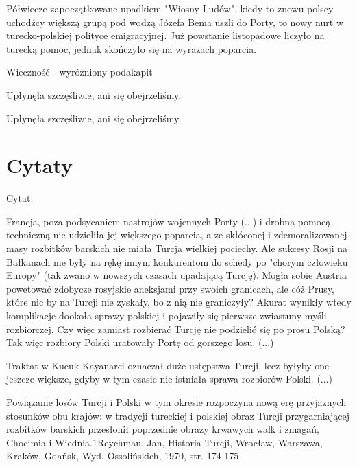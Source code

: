 Półwiecze zapoczątkowane upadkiem "Wiosny Ludów", kiedy to znowu polscy
uchodźcy większą grupą pod wodzą Józefa Bema uszli do Porty, to nowy
nurt w turecko-polskiej polityce emigracyjnej. Już powstanie listopadowe
liczyło na turecką pomoc, jednak skończyło się na wyrazach poparcia.

Wieczność - wyróżniony podakapit

Upłynęła szczęśliwie, ani się obejrzeliśmy.

Upłynęła szczęśliwie, ani się obejrzeliśmy.


\section*{Cytaty}\label{cytaty}

Cytat:

Francja, poza podsycaniem nastrojów wojennych Porty (...) i drobną
pomocą techniczną nie udzieliła jej większego poparcia, a ze skłóconej i
zdemoralizowanej masy rozbitków barskich nie miała Turcja wielkiej
pociechy. Ale sukcesy Rosji na Bałkanach nie były na rękę innym
konkurentom do schedy po "chorym człowieku Europy" (tak zwano w nowszych
czasach upadającą Turcję). Mogła sobie Austria powetować zdobycze
rosyjskie aneksjami przy swoich granicach, ale cóż Prusy, które nic by
na Turcji nie zyskały, bo z nią nie graniczyły? Akurat wynikły wtedy
komplikacje dookoła sprawy polskiej i pojawiły się pierwsze zwiastuny
myśli rozbiorczej. Czy więc zamiast rozbierać Turcję nie podzielić się
po prosu Polską? Tak więc rozbiory Polski uratowały Portę od gorszego
losu. (...)

Traktat w Kucuk Kayanarci oznaczał duże ustępstwa Turcji, lecz byłyby
one jeszcze większe, gdyby w tym czasie nie istniała sprawa rozbiorów
Polski. (...)

Powiązanie losów Turcji i Polski w tym okresie rozpoczyna nową erę
przyjaznych stosunków obu krajów: w tradycji tureckiej i polskiej obraz
Turcji przygarniającej rozbitków barskich przesłonił poprzednie obrazy
krwawych walk i zmagań, Chocimia i Wiednia.1Reychman, Jan, Historia
Turcji, Wrocław, Warszawa, Kraków, Gdańsk, Wyd. Ossolińskich, 1970, str.
174-175
